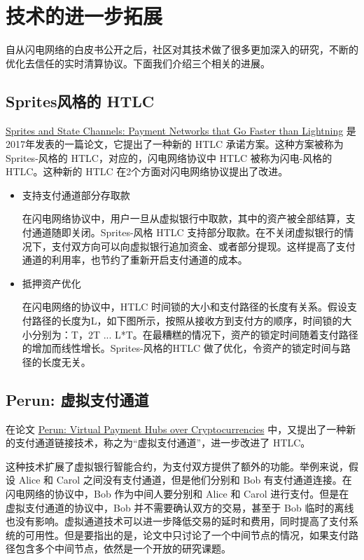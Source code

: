 \section{技术的进一步拓展}
自从闪电网络的白皮书公开之后，社区对其技术做了很多更加深入的研究，不断的优化去信任的实时清算协议。下面我们介绍三个相关的进展。

\subsection{Sprites风格的 HTLC}
\href{https://arxiv.org/abs/1702.05812}{Sprites and State Channels: Payment Networks that Go Faster than Lightning} 是2017年发表的一篇论文，它提出了一种新的 HTLC 承诺方案。这种方案被称为 Sprites-风格的 HTLC，对应的，闪电网络协议中 HTLC 被称为闪电-风格的HTLC。这种新的 HTLC 在2个方面对闪电网络协议提出了改进。

\begin{itemize}
    \item 支持支付通道部分存取款

    在闪电网络协议中，用户一旦从虚拟银行中取款，其中的资产被全部结算，支付通道随即关闭。Sprites-风格 HTLC 支持部分取款。在不关闭虚拟银行的情况下，支付双方向可以向虚拟银行追加资金、或者部分提现。这样提高了支付通道的利用率，也节约了重新开启支付通道的成本。

    \item 抵押资产优化

    在闪电网络的协议中，HTLC 时间锁的大小和支付路径的长度有关系。假设支付路径的长度为L，如下图所示，按照从接收方到支付方的顺序，时间锁的大小分别为：T，2T ... L*T。在最糟糕的情况下，资产的锁定时间随着支付路径的增加而线性增长。Sprites-风格的HTLC 做了优化，令资产的锁定时间与路径的长度无关。
\end{itemize}

\subsection{Perun: 虚拟支付通道}
在论文 \href{https://eprint.iacr.org/2017/635.pdf}{Perun: Virtual Payment Hubs over Cryptocurrencies} 中，又提出了一种新的支付通道链接技术，称之为“虚拟支付通道”，进一步改进了 HTLC。

这种技术扩展了虚拟银行智能合约，为支付双方提供了额外的功能。举例来说，假设 Alice 和 Carol 之间没有支付通道，但是他们分别和 Bob 有支付通道连接。在闪电网络的协议中，Bob 作为中间人要分别和 Alice 和 Carol 进行支付。但是在虚拟支付通道的协议中，Bob 并不需要确认双方的交易，甚至于 Bob 临时的离线也没有影响。虚拟通道技术可以进一步降低交易的延时和费用，同时提高了支付系统的可用性。但是要指出的是，论文中只讨论了一个中间节点的情况，如果支付路径包含多个中间节点，依然是一个开放的研究课题。

